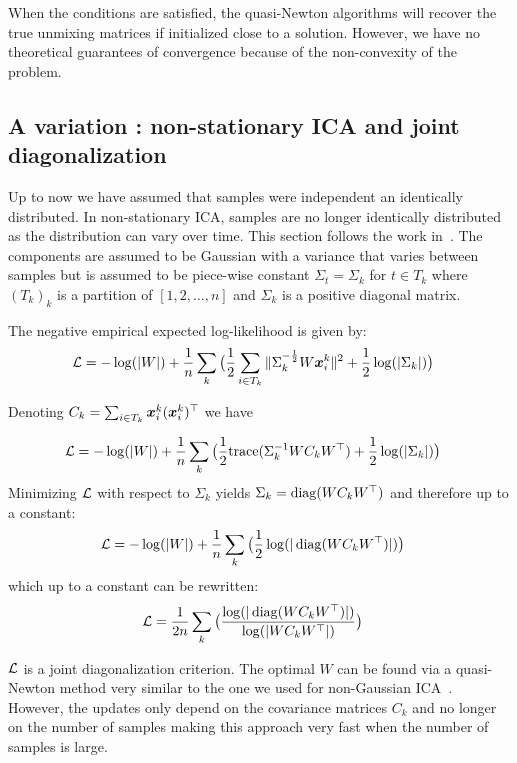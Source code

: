When the conditions are satisfied, the quasi-Newton algorithms will recover the
true unmixing matrices if initialized close to a solution. However, we have no
theoretical guarantees of convergence because of the non-convexity of the problem.

\subsection{A variation : non-stationary ICA and joint diagonalization}
Up to now we have assumed that samples were independent an identically distributed. In non-stationary ICA, samples are no longer identically distributed as the distribution can vary over time.
This section follows the work in~\cite{pham2001blind}.
The components are assumed to be Gaussian with a variance that varies between
samples but is assumed to be piece-wise constant $\Sigma_t = \Sigma_k$ for $t \in
T_k$ where $(T_k)_k$ is a partition of $[1, 2, \dots, n]$ and $\Sigma_k$ is a
positive diagonal matrix.

The negative empirical expected log-likelihood is given by:
\begin{align}  
  \mathcal{L} &= -\log(|W|)  + \frac1{n} \sum_k \big( \frac12 \sum_{i \in T_k}\|\Sigma_k^{-\frac12} W \boldsymbol{x}^k_i \|^2 + \frac12 \log(|\Sigma_k|) \big)
\end{align}

Denoting $C_k = \sum_{i \in T_k} \boldsymbol{x}_i^k (\boldsymbol{x}_i^k)^{\top}$ we have 

\begin{align}  
  \mathcal{L} &= -\log(|W|)  + \frac1{n} \sum_k \big( \frac1{2} {\mathrm{ trace}}(\Sigma_k^{-1} W C_k W^{\top}) + \frac12 \log(|\Sigma_k|) \big)
\end{align}
Minimizing $\mathcal{L}$ with respect to $\Sigma_k$ yields $\Sigma_k = \operatorname*{diag}(W C_k
W^{\top})$ and therefore up to a constant:
\begin{align}  
  \mathcal{L} &= -\log(|W|)  + \frac1{n} \sum_k \big(\frac12 \log(|\operatorname*{diag}(W C_k W^{\top})|) \big)
\end{align}
which up to a constant can be rewritten:
\begin{align}  
  \mathcal{L} &=\frac1{2n} \sum_k \big(\frac{\log(|\operatorname*{diag}(W C_k W^{\top})|)}{\log(|W C_k W^{\top}|)} \big)
\end{align}

$\mathcal{L}$ is a joint diagonalization criterion. The optimal $W$ can be found via a
quasi-Newton method very similar to the one we used for non-Gaussian
ICA~\cite{ablin2018beyond}. However, the updates only depend on the covariance
matrices $C_k$ and no longer on the number of samples making this approach very
fast when the number of samples is large.

